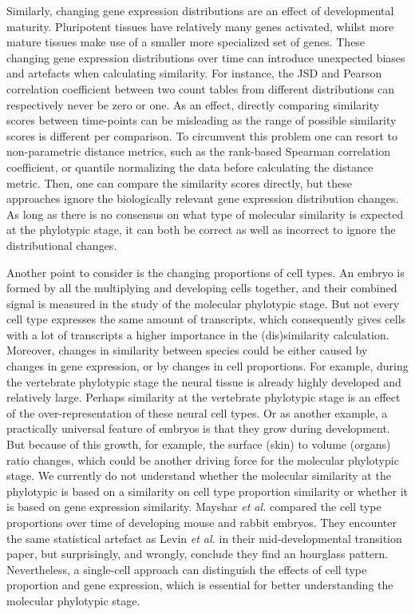 Similarly, changing gene expression distributions are an effect of developmental maturity\cite{Kannan2021}. Pluripotent tissues have relatively many genes activated, whilst more mature tissues make use of a smaller more specialized set of genes. These changing gene expression distributions over time can introduce unexpected biases and artefacts when calculating similarity. For instance, the JSD and Pearson correlation coefficient between two count tables from different distributions can respectively never be zero or one. As an effect, directly comparing similarity scores between time-points can be misleading as the range of possible similarity scores is different per comparison. To circumvent this problem one can resort to non-parametric distance metrics, such as the rank-based Spearman correlation coefficient\cite{Irie2011}, or quantile normalizing the data before calculating the distance metric\cite{marletaz2018}. Then, one can compare the similarity scores directly, but these approaches ignore the biologically relevant gene expression distribution changes. As long as there is no consensus on what type of molecular similarity is expected at the phylotypic stage, it can both be correct as well as incorrect to ignore the distributional changes. 

Another point to consider is the changing proportions of cell types. An embryo is formed by all the multiplying and developing cells together, and their combined signal is measured in the study of the molecular phylotypic stage. But not every cell type expresses the same amount of transcripts\cite{Kim2023, Percharde2017}, which consequently gives cells with a lot of transcripts a higher importance in the (dis)similarity calculation. Moreover, changes in similarity between species could be either caused by changes in gene expression, or by changes in cell proportions. For example, during the vertebrate phylotypic stage the neural tissue is already highly developed and relatively large. Perhaps similarity at the vertebrate phylotypic stage is an effect of the over-representation of these neural cell types. Or as another example, a practically universal feature of embryos is that they grow during development. But because of this growth, for example, the surface (skin) to volume (organs) ratio changes, which could be another driving force for the molecular phylotypic stage. We currently do not understand whether the molecular similarity at the phylotypic is based on a similarity on cell type proportion similarity or whether it is based on gene expression similarity. Mayshar \textit{et al.} compared the cell type proportions over time of developing mouse and rabbit embryos. They encounter the same statistical artefact as Levin \textit{et al.} in their mid-developmental transition paper, but surprisingly, and wrongly, conclude they find an hourglass pattern\cite{Mayshar2022}. Nevertheless, a single-cell approach can distinguish the effects of cell type proportion and gene expression, which is essential for better understanding the molecular phylotypic stage.

